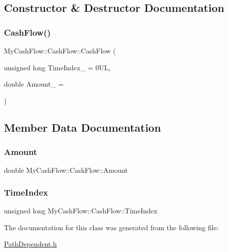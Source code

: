 \subsection{Constructor \& Destructor Documentation}
\hypertarget{classMyCashFlow_1_1CashFlow_afa22922e78237519371139953975671c}{}\label{classMyCashFlow_1_1CashFlow_afa22922e78237519371139953975671c} 
\subsubsection{\texorpdfstring{Cash\+Flow()}{CashFlow()}}
{\footnotesize\ttfamily My\+Cash\+Flow\+::\+Cash\+Flow\+::\+Cash\+Flow (\begin{DoxyParamCaption}\item[{unsigned long}]{Time\+Index\+\_\+ = {\ttfamily 0UL},  }\item[{double}]{Amount\+\_\+ = {} }\end{DoxyParamCaption})\hspace{0.3cm}{\ttfamily [inline]}}



\subsection{Member Data Documentation}
\hypertarget{classMyCashFlow_1_1CashFlow_ac6ddae0428eef4e3bb9b574e2fee077d}{}\label{classMyCashFlow_1_1CashFlow_ac6ddae0428eef4e3bb9b574e2fee077d} 
\subsubsection{\texorpdfstring{Amount}{Amount}}
{\footnotesize\ttfamily double My\+Cash\+Flow\+::\+Cash\+Flow\+::\+Amount}

\hypertarget{classMyCashFlow_1_1CashFlow_a6949eb507bf2de68eae7c60ed3cedbb7}{}\label{classMyCashFlow_1_1CashFlow_a6949eb507bf2de68eae7c60ed3cedbb7} 
\subsubsection{\texorpdfstring{Time\+Index}{TimeIndex}}
{\footnotesize\ttfamily unsigned long My\+Cash\+Flow\+::\+Cash\+Flow\+::\+Time\+Index}



The documentation for this class was generated from the following file\+:\begin{DoxyCompactItemize}
\item 
\hyperlink{PathDependent_8h}{Path\+Dependent.\+h}\end{DoxyCompactItemize}
